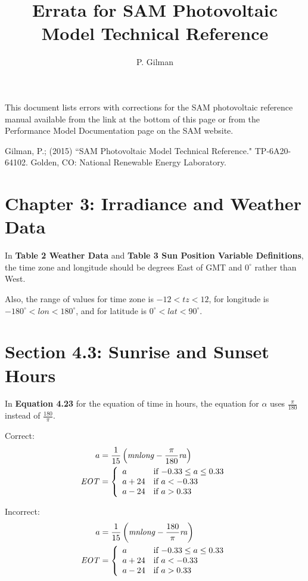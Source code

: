 \documentclass[report]{nrel}
\title{Errata for SAM Photovoltaic Model Technical Reference}
\author{P. Gilman}
\begin{document}
This document lists errors with corrections for the SAM photovoltaic reference manual available from the link at the bottom of this page or from the Performance Model Documentation page on the SAM website.

Gilman, P.; (2015) ``SAM Photovoltaic Model Technical Reference." TP-6A20-64102. Golden, CO: National Renewable Energy Laboratory.

\section*{Chapter 3: Irradiance and Weather Data}

In \textbf{Table 2 Weather Data} and \textbf{Table 3 Sun Position Variable Definitions}, the time zone and longitude should be degrees East of GMT and $0^\circ$ rather than West.

Also, the range of values for time zone is $-12 < \mathit{tz} < 12$, for longitude is $-180^\circ < \mathit{lon} < 180^\circ$, and for latitude is $ 0^\circ < \mathit{lat} < 90^\circ$.

\section*{Section 4.3: Sunrise and Sunset Hours}

In \textbf{Equation 4.23} for the equation of time in hours, the equation for $\alpha$ uses $\frac{\pi}{180}$ instead of $\frac{180}{\pi}$.

Correct:
\begin{align*}
a &= \frac{1}{15}\left(\mathit{mnlong} - \frac{\pi}{180}\mathit{ra}\right)\notag\\
\mathit{EOT} &= 
\left\{
   \begin{array}{ll}
     a & \text{if $-0.33 \leq a \leq 0.33$}\\
     a + 24 & \text{if $a<-0.33$}\\
     a - 24 & \text{if $a>0.33$}
   \end{array}
\right. 
\end{align*}

Incorrect:
\begin{align*}
a &= \frac{1}{15}\left(\mathit{mnlong} - \frac{180}{\pi}\mathit{ra}\right)\notag\\
\mathit{EOT} &= 
\left\{
   \begin{array}{ll}
     a & \text{if $-0.33 \leq a \leq 0.33$}\\
     a + 24 & \text{if $a<-0.33$}\\
     a - 24 & \text{if $a>0.33$}
   \end{array}
\right. 
\end{align*}
\end{document}
